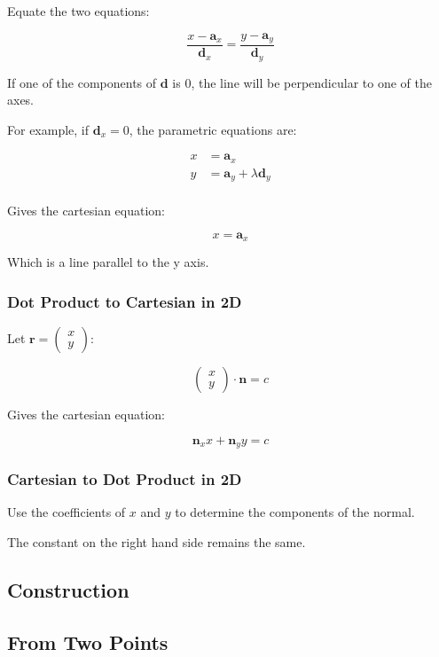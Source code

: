 \documentclass[a4paper,11pt]{report}
\newcommand{\bb}{\boldsymbol}
\begin{document}
Equate the two equations:

$$
\frac{x - \bb{a}_x}{\bb{d}_x} = \frac{y - \bb{a}_y}{\bb{d}_y}
$$

If one of the components of $\bb{d}$ is 0, the line will be perpendicular to
one of the axes.

For example, if $\bb{d}_x = 0$, the parametric equations are:

$$
\begin{aligned}
x & = \bb{a}_x \\
y & = \bb{a}_y + \lambda \bb{d}_y \\
\end{aligned}
$$

Gives the cartesian equation:

$$
x = \bb{a}_x
$$

Which is a line parallel to the y axis.

\subsubsection{Dot Product to Cartesian in 2D}

Let $\bb{r} = \begin{pmatrix} x \\ y \end{pmatrix}$:

$$
\begin{pmatrix} x \\ y \end{pmatrix} \cdot \bb{n} = c
$$

Gives the cartesian equation:

$$
\bb{n}_x x + \bb{n}_y y = c
$$

\subsubsection{Cartesian to Dot Product in 2D}

Use the coefficients of $x$ and $y$ to determine the components of the normal.

The constant on the right hand side remains the same.

\subsection{Construction}

\subsection{From Two Points}
\end{document}
